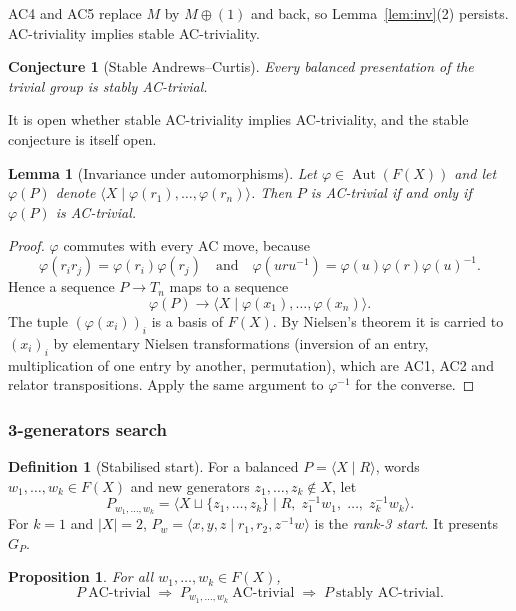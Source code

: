 \documentclass[11pt]{article}
\newtheorem{proposition}[theorem]{Proposition}
\newtheorem{lemma}[theorem]{Lemma}
\newtheorem{conjecture}[theorem]{Conjecture}
\theoremstyle{definition}
\newtheorem{definition}[theorem]{Definition}
\theoremstyle{remark}
\newcommand{\F}{F}
\newcommand{\pres}[2]{\langle #1 \mid #2 \rangle}
\newcommand{\Aut}{\operatorname{Aut}}
\begin{document}
AC4 and AC5 replace $M$ by $M\oplus(1)$ and back, so Lemma~\ref{lem:inv}(2) persists. AC-triviality implies stable
AC-triviality.

\begin{conjecture}[Stable Andrews--Curtis]
Every balanced presentation of the trivial group is stably AC-trivial.
\end{conjecture}

It is open whether stable AC-triviality implies AC-triviality, and the stable conjecture is itself open.

\begin{lemma}[Invariance under automorphisms]\label{lem:aut}
Let $\varphi\in\Aut(\F(X))$ and let $\varphi(P)$ denote $\pres{X}{\varphi(r_1),\dots,\varphi(r_n)}$. Then $P$ is AC-trivial if and
only if $\varphi(P)$ is AC-trivial.
\end{lemma}

\begin{proof}
$\varphi$ commutes with every AC move, because
\[\varphi(r_ir_j)=\varphi(r_i)\varphi(r_j)\quad\text{and}\quad\varphi(uru^{-1})=\varphi(u)\varphi(r)\varphi(u)^{-1}.\]
Hence a sequence $P\to T_n$ maps to a sequence
\[\varphi(P)\longrightarrow\pres{X}{\varphi(x_1),\dots,\varphi(x_n)}.\]
The tuple $(\varphi(x_i))_i$ is a basis of $\F(X)$. By
Nielsen's theorem it is carried to $(x_i)_i$ by elementary Nielsen transformations (inversion of an entry,
multiplication of one entry by another, permutation), which are AC1, AC2 and relator transpositions. Apply the same
argument to $\varphi^{-1}$ for the converse.
\end{proof}

\subsubsection{3-generators search}

\begin{definition}[Stabilised start]\label{def:start}
For a balanced $P=\pres{X}{R}$, words $w_1,\dots,w_k\in\F(X)$ and new generators $z_1,\dots,z_k\notin X$, let
\[
P_{w_1,\dots,w_k}=\pres{X\sqcup\{z_1,\dots,z_k\}}{R,\;z_1^{-1}w_1,\;\dots,\;z_k^{-1}w_k}.
\]
For $k=1$ and $|X|=2$, $P_w=\pres{x,y,z}{r_1,r_2,z^{-1}w}$ is the \emph{rank-3 start}. It presents $G_P$.
\end{definition}

\begin{proposition}\label{prop:stab}
For all $w_1,\dots,w_k\in\F(X)$,
\[
P\ \text{AC-trivial}\;\Longrightarrow\;P_{w_1,\dots,w_k}\ \text{AC-trivial}\;\Longrightarrow\;P\ \text{stably AC-trivial}.
\]
\end{proposition}
\end{document}
